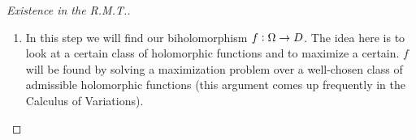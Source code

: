 \begin{proof}[Existence in the R.M.T.]
\begin{enumerate}
\begin{itemize}
    \item $F$ is holomorphic on $\om$, since $g(z) \neq g(w) + 2 \pi i, \; \forall z \in \om$
    \item $F$ is injective on $\om$, since $F(z_1) = F(z_2) \Rightarrow g(z_1) = g(z_2) \Rightarrow z_1 = z_2$ (since $g$ is injective)
    \item since $g(\om) \cap D_\varepsilon ( g(w) + 2 \pi i) = \varnothing$, then $\abs{g(z) - (g(w) + 2 \pi i)} \geq \varepsilon, \; \forall \, z \in \om$. That is to say that all points in the image of $g$ must lie at least $\varepsilon$ away from $g(w) + 2 \pi i$. Thus it follows that:
    
    \begin{align*}
        \abs{F(z)} = \frac{1}{\abs{g(z) - (g(w) + 2 \pi i)}} \leq \frac{1}{\varepsilon}, \; \forall \, z \in \om
    \end{align*}
    
    Thus $F(\om) \subset \overline{D_\frac{1}{\varepsilon} (0)}$.
\end{itemize}

Thus $F: \om \to F(\om) \subset \overline{D_\frac{1}{\varepsilon} (0)} \subset D_\frac{2}{\varepsilon} (0)$ is holomorphic, bijective, and $F(\om)$ is open by the Open Mapping Theorem. Applying a biholomorphic rescaling $G: z \mapsto \frac{\varepsilon }{2} z$ we get:
\begin{align*}
    \om \xrightarrow[]{F} F(\om) \xrightarrow[]{G} G(F(\om)) \subset D_1(0)
\end{align*}

Since $F$ and $G$ are both biholomorphic, so is $F \circ G$. It follows that $\om$ is biholomorphic to $G(F(\om)) \subset D$ with $z_0 \mapsto G(F(z_0))$.\\

Finally we can scale and translate the image so that $z_0$ maps to $0$.

INSERT TIKZ

We are now done step one. We can relabel $F(G(\om))$ as $\om$, and similarly relabel $F(G(z_0))$ as $z_0$. 

\subsection{Step 2}

\item In this step we will find our biholomorphism $f: \Omega \to D$. The idea here is to look at a certain class of holomorphic functions and to maximize a certain. $f$ will be found by solving a maximization problem over a well-chosen class of admissible holomorphic functions (this argument comes up frequently in the Calculus of Variations).\\


\end{enumerate}
\end{proof}
